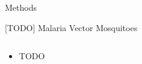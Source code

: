 \documentclass[final,hyperref={pdfpagelabels=false}]{beamer}
\begin{document}
\begin{frame}[t]
\begin{columns}[t]
\begin{column}{.465\textwidth}
\begin{block}{Methods}
\begin{itemize}


\end{itemize}

\end{block}


\begin{block}{[TODO] Malaria Vector Mosquitoes}

\begin{columns} %
\begin{column}{.4\textwidth} %
\begin{itemize}
\item TODO
\end{itemize}
\end{column}


\end{columns}
\end{block}
\end{column}
\end{columns}
\end{frame}
\end{document}
